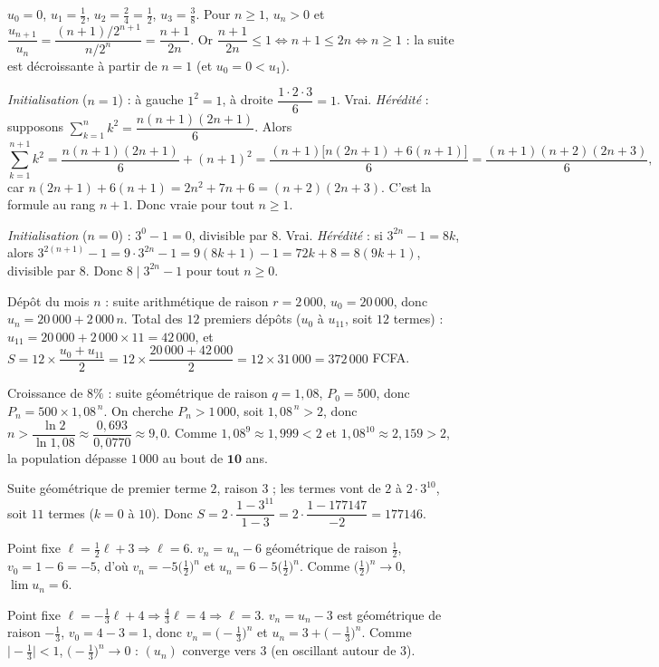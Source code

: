 $u_0=0$, $u_1=\tfrac12$, $u_2=\tfrac{2}{4}=\tfrac12$, $u_3=\tfrac{3}{8}$. Pour $n\ge1$, $u_n>0$ et
$\dfrac{u_{n+1}}{u_n}=\dfrac{(n+1)/2^{n+1}}{n/2^n}=\dfrac{n+1}{2n}$. Or $\dfrac{n+1}{2n}\le1\iff n+1\le2n\iff n\ge1$ :
la suite est décroissante à partir de $n=1$ (et $u_0=0<u_1$).

\emph{Initialisation} ($n=1$) : à gauche $1^2=1$, à droite $\dfrac{1\cdot2\cdot3}{6}=1$. Vrai.
\emph{Hérédité} : supposons $\sum_{k=1}^n k^2=\dfrac{n(n+1)(2n+1)}{6}$. Alors
\[
\sum_{k=1}^{n+1}k^2=\dfrac{n(n+1)(2n+1)}{6}+(n+1)^2=\dfrac{(n+1)\bigl[n(2n+1)+6(n+1)\bigr]}{6}
=\dfrac{(n+1)(n+2)(2n+3)}{6},
\]
car $n(2n+1)+6(n+1)=2n^2+7n+6=(n+2)(2n+3)$. C'est la formule au rang $n+1$. Donc vraie pour tout $n\ge1$.

\emph{Initialisation} ($n=0$) : $3^0-1=0$, divisible par $8$. Vrai.
\emph{Hérédité} : si $3^{2n}-1=8k$, alors
$3^{2(n+1)}-1=9\cdot3^{2n}-1=9(8k+1)-1=72k+8=8(9k+1)$, divisible par $8$.
Donc $8\mid 3^{2n}-1$ pour tout $n\ge0$.

Dépôt du mois $n$ : suite arithmétique de raison $r=2\,000$, $u_0=20\,000$, donc
$u_n=20\,000+2\,000\,n$. Total des $12$ premiers dépôts ($u_0$ à $u_{11}$, soit $12$ termes) :
$u_{11}=20\,000+2\,000\times11=42\,000$, et
$S=12\times\dfrac{u_0+u_{11}}{2}=12\times\dfrac{20\,000+42\,000}{2}=12\times31\,000=372\,000$ FCFA.

Croissance de $8\%$ : suite géométrique de raison $q=1{,}08$, $P_0=500$, donc
$P_n=500\times1{,}08^{\,n}$. On cherche $P_n>1\,000$, soit $1{,}08^{\,n}>2$, donc
$n>\dfrac{\ln2}{\ln1{,}08}\approx\dfrac{0{,}693}{0{,}0770}\approx9{,}0$. Comme $1{,}08^{9}\approx1{,}999<2$
et $1{,}08^{10}\approx2{,}159>2$, la population dépasse $1\,000$ au bout de $\mathbf{10}$ ans.

Suite géométrique de premier terme $2$, raison $3$ ; les termes vont de $2$ à $2\cdot3^{10}$,
soit $11$ termes ($k=0$ à $10$). Donc
$S=2\cdot\dfrac{1-3^{11}}{1-3}=2\cdot\dfrac{1-177147}{-2}=177146$.

Point fixe $\ell=\tfrac12\ell+3\Rightarrow\ell=6$. $v_n=u_n-6$ géométrique de raison $\tfrac12$,
$v_0=1-6=-5$, d'où $v_n=-5\bigl(\tfrac12\bigr)^n$ et $u_n=6-5\bigl(\tfrac12\bigr)^n$.
Comme $\bigl(\tfrac12\bigr)^n\to0$, $\displaystyle\lim u_n=6$.

Point fixe $\ell=-\tfrac13\ell+4\Rightarrow\tfrac43\ell=4\Rightarrow\ell=3$. $v_n=u_n-3$ est
géométrique de raison $-\tfrac13$, $v_0=4-3=1$, donc $v_n=\bigl(-\tfrac13\bigr)^n$ et
$u_n=3+\bigl(-\tfrac13\bigr)^n$. Comme $\bigl|-\tfrac13\bigr|<1$, $\bigl(-\tfrac13\bigr)^n\to0$ :
$(u_n)$ converge vers $3$ (en oscillant autour de $3$).

